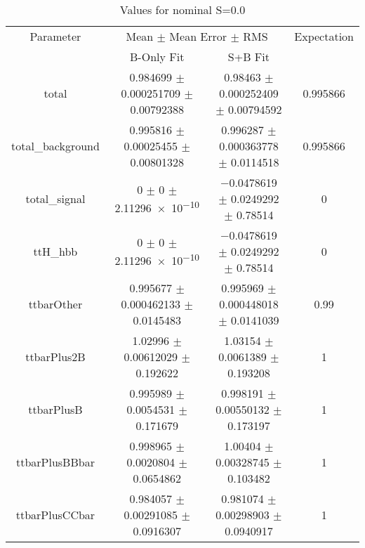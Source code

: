 \begin{table}
\centering
\caption{Values for nominal S=0.0}
\begin{tabular}{cccc}
\toprule
Parameter & \multicolumn{2}{c}{Mean $\pm$ Mean Error $\pm$ RMS} & Expectation\\
 & B-Only Fit & S+B Fit & \\
\midrule
total & \num{0.984699} $\pm$ \num{0.000251709} $\pm$ \num{0.00792388} & \num{0.98463} $\pm$ \num{0.000252409} $\pm$ \num{0.00794592} & \num{0.995866}\\
total\_background & \num{0.995816} $\pm$ \num{0.00025455} $\pm$ \num{0.00801328} & \num{0.996287} $\pm$ \num{0.000363778} $\pm$ \num{0.0114518} & \num{0.995866}\\
total\_signal & \num{0} $\pm$ \num{0} $\pm$ \num{2.11296e-10} & \num{-0.0478619} $\pm$ \num{0.0249292} $\pm$ \num{0.78514} & \num{0}\\
ttH\_hbb & \num{0} $\pm$ \num{0} $\pm$ \num{2.11296e-10} & \num{-0.0478619} $\pm$ \num{0.0249292} $\pm$ \num{0.78514} & \num{0}\\
ttbarOther & \num{0.995677} $\pm$ \num{0.000462133} $\pm$ \num{0.0145483} & \num{0.995969} $\pm$ \num{0.000448018} $\pm$ \num{0.0141039} & \num{0.99}\\
ttbarPlus2B & \num{1.02996} $\pm$ \num{0.00612029} $\pm$ \num{0.192622} & \num{1.03154} $\pm$ \num{0.0061389} $\pm$ \num{0.193208} & \num{1}\\
ttbarPlusB & \num{0.995989} $\pm$ \num{0.0054531} $\pm$ \num{0.171679} & \num{0.998191} $\pm$ \num{0.00550132} $\pm$ \num{0.173197} & \num{1}\\
ttbarPlusBBbar & \num{0.998965} $\pm$ \num{0.0020804} $\pm$ \num{0.0654862} & \num{1.00404} $\pm$ \num{0.00328745} $\pm$ \num{0.103482} & \num{1}\\
ttbarPlusCCbar & \num{0.984057} $\pm$ \num{0.00291085} $\pm$ \num{0.0916307} & \num{0.981074} $\pm$ \num{0.00298903} $\pm$ \num{0.0940917} & \num{1}\\
\bottomrule
\end{tabular}
\end{table}
